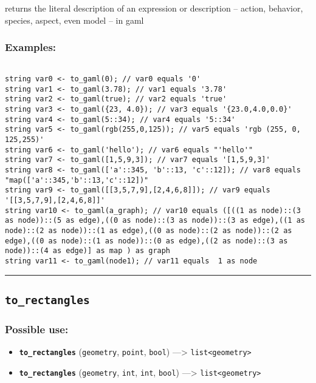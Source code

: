 \documentclass[]{book}
\providecommand{\tightlist}{%
  \setlength{\itemsep}{0pt}\setlength{\parskip}{0pt}}
\theoremstyle{definition}
\theoremstyle{definition}
\theoremstyle{definition}
\theoremstyle{remark}
\begin{document}
returns the literal description of an expression or description --
action, behavior, species, aspect, even model -- in gaml

\subsubsection{Examples:}\label{examples-359}

\begin{verbatim}
 
string var0 <- to_gaml(0); // var0 equals '0' 
string var1 <- to_gaml(3.78); // var1 equals '3.78' 
string var2 <- to_gaml(true); // var2 equals 'true' 
string var3 <- to_gaml({23, 4.0}); // var3 equals '{23.0,4.0,0.0}' 
string var4 <- to_gaml(5::34); // var4 equals '5::34' 
string var5 <- to_gaml(rgb(255,0,125)); // var5 equals 'rgb (255, 0, 125,255)' 
string var6 <- to_gaml('hello'); // var6 equals "'hello'" 
string var7 <- to_gaml([1,5,9,3]); // var7 equals '[1,5,9,3]' 
string var8 <- to_gaml(['a'::345, 'b'::13, 'c'::12]); // var8 equals "map(['a'::345,'b'::13,'c'::12])" 
string var9 <- to_gaml([[3,5,7,9],[2,4,6,8]]); // var9 equals '[[3,5,7,9],[2,4,6,8]]' 
string var10 <- to_gaml(a_graph); // var10 equals ([((1 as node)::(3 as node))::(5 as edge),((0 as node)::(3 as node))::(3 as edge),((1 as node)::(2 as node))::(1 as edge),((0 as node)::(2 as node))::(2 as edge),((0 as node)::(1 as node))::(0 as edge),((2 as node)::(3 as node))::(4 as edge)] as map ) as graph 
string var11 <- to_gaml(node1); // var11 equals  1 as node
\end{verbatim}

\begin{center}\rule{0.5\linewidth}{\linethickness}\end{center}

\subsection{\texorpdfstring{\texttt{to\_rectangles}}{to\_rectangles}}\label{to_rectangles}

\subsubsection{Possible use:}\label{possible-use-522}

\begin{itemize}
\tightlist
\item
  \textbf{\texttt{to\_rectangles}} (\texttt{geometry}, \texttt{point},
  \texttt{bool}) ---\textgreater{}
  \texttt{list\textless{}geometry\textgreater{}}
\item
  \textbf{\texttt{to\_rectangles}} (\texttt{geometry}, \texttt{int},
  \texttt{int}, \texttt{bool}) ---\textgreater{}
  \texttt{list\textless{}geometry\textgreater{}}
\end{itemize}
\end{document}
